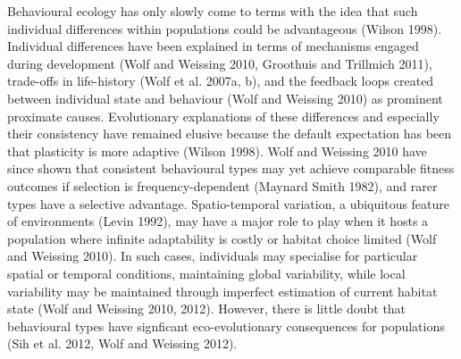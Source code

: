\documentclass[]{scrartcl}
\begin{document}
\begin{linenumbers}
Behavioural ecology has only slowly come to terms with the idea that
such individual differences within populations could be advantageous
(Wilson 1998). Individual differences have been explained in terms of
mechanisms engaged during development (Wolf and Weissing 2010, Groothuis
and Trillmich 2011), trade-offs in life-history (Wolf et al. 2007a, b),
and the feedback loops created between individual state and behaviour
(Wolf and Weissing 2010) as prominent proximate causes. Evolutionary
explanations of these differences and especially their consistency have
remained elusive because the default expectation has been that
plasticity is more adaptive (Wilson 1998). Wolf and Weissing 2010 have
since shown that consistent behavioural types may yet achieve comparable
fitness outcomes if selection is frequency-dependent (Maynard Smith
1982), and rarer types have a selective advantage. Spatio-temporal
variation, a ubiquitous feature of environments (Levin 1992), may have a
major role to play when it hosts a population where infinite
adaptability is costly or habitat choice limited (Wolf and Weissing
2010). In such cases, individuals may specialise for particular spatial
or temporal conditions, maintaining global variability, while local
variability may be maintained through imperfect estimation of current
habitat state (Wolf and Weissing 2010, 2012). However, there is little
doubt that behavioural types have signficant eco-evolutionary
consequences for populations (Sih et al. 2012, Wolf and Weissing 2012).


\end{linenumbers}
\end{document}
